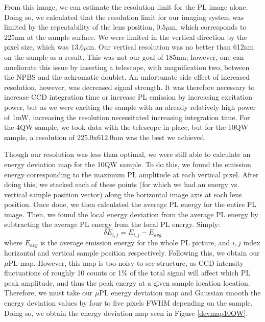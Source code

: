 \indent From this image, we can estimate the resolution limit for the PL image alone. Doing so, we calculated that the resolution limit for our imaging system was limited by the repeatability of the lens position, $0.5\mu$m, which corresponds to 225nm at the sample surface. We were limited in the vertical direction by the pixel size, which was $13.6\mu$m. Our vertical resolution was no better than 612nm on the sample as a result. This was not our goal of 185nm; however, one can ameliorate this issue by inserting a telescope, with magnification two, between the NPBS and the achromatic doublet. An unfortunate side effect of increased resolution, however, was decreased signal strength. It was therefore necessary to increase CCD integration time or increase PL emission by increasing excitation power, but as we were exciting the sample with an already relatively high power of 1mW, increasing the resolution necessitated increasing integration time. For the 4QW sample, we took data with the telescope in place, but for the 10QW sample, a resolution of 225.0x612.0nm was the best we achieved.
 


\indent Though our resolution was less than optimal, we were still able to calculate an energy deviation map for the 10QW sample. To do this, we found the emission energy corresponding to the maximum PL amplitude at each vertical pixel. After doing this, we stacked each of these points (for which we had an energy vs. vertical sample position vector) along the horizontal image axis at each lens position. Once done, we then calculated the average PL energy for the entire PL image. Then, we found the local energy deviation from the average PL energy by subtracting the average PL energy from the local PL energy. Simply: 
\begin{equation}
\delta E_{i,j} = E_{i,j}-E_{avg}
\end{equation}
where $E_{avg}$ is the average emission energy for the whole PL picture, and $i,j$ index horizontal and vertical sample position respectively. Following this, we obtain our $\mu$PL map. However, this map is too noisy to see structure, as CCD intensity fluctuations of roughly 10 counts or 1\% of the total signal will affect which PL peak amplitude, and thus the peak energy at a given sample location location. Therefore, we must take our $\mu$PL energy deviation map and Gaussian smooth the energy deviation values by four to five pixels FWHM depending on the sample. Doing so, we obtain the energy deviation map seen in Figure \ref{devmap10QW}.

